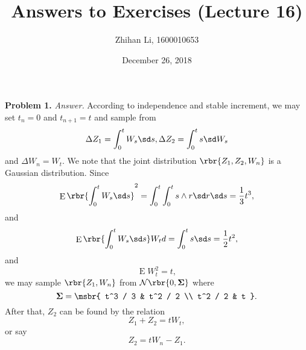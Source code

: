 \documentclass[english, nochinese]{pnote}
\title{Answers to Exercises (Lecture 16)}
\author{Zhihan Li, 1600010653}
\date{December 26, 2018}
\DeclareMathOperator\ope{\mathrm{E}}
\begin{document}
\maketitle

\textbf{Problem 1.} \textit{Answer.} According to independence and stable increment, we may set $ t_n = 0 $ and $ t_{ n + 1 } = t $ and sample from
\begin{gather}
\Delta Z_1 = \int_0^t W_s \sd s,
\Delta Z_2 = \int_0^t s \sd W_s
\end{gather}
and $ \Delta W_n = W_t $. We note that the joint distribution $ \rbr{ Z_1, Z_2, W_n } $ is a Gaussian distribution. Since
\begin{equation}
\ope \rbr{ \int_0^t W_s \sd s }^2 = \int_0^t \int_0^t s \wedge r \sd r \sd s = \frac{1}{3} t^3,
\end{equation}
and
\begin{equation}
\ope \rbr{ \int_0^t W_s \sd s } W_t d= \int_0^t s \sd s = \frac{1}{2} t^2,
\end{equation}
and
\begin{equation}
\ope W_t^2 = t,
\end{equation}
we may sample $ \rbr{ Z_1, W_n } $ from $ \mathcal{N} \rbr{ 0, \bm{\Sigma} } 
$ where
\begin{equation}
\bm{\Sigma} = \msbr{ t^3 / 3 & t^2 / 2 \\ t^2 / 2 & t }.
\end{equation}
After that, $Z_2$ can be found by the relation
\begin{equation}
Z_1 + Z_2 = t W_t,
\end{equation}
or say
\begin{equation}
Z_2 = t W_n - Z_1.
\end{equation}
\end{document}
